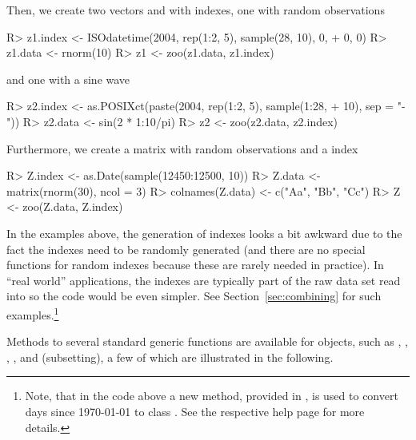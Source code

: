 \documentclass[article,nojss]{jss}
\begin{document}
Then, we create two vectors  and  with  
indexes, one with random observations
\begin{Schunk}
\begin{Sinput}
R> z1.index <- ISOdatetime(2004, rep(1:2, 5), sample(28, 10), 0, 
+     0, 0)
R> z1.data <- rnorm(10)
R> z1 <- zoo(z1.data, z1.index)
\end{Sinput}
\end{Schunk}
and one with a sine wave
\begin{Schunk}
\begin{Sinput}
R> z2.index <- as.POSIXct(paste(2004, rep(1:2, 5), sample(1:28, 
+     10), sep = "-"))
R> z2.data <- sin(2 * 1:10/pi)
R> z2 <- zoo(z2.data, z2.index)
\end{Sinput}
\end{Schunk}
Furthermore, we create a matrix  with random observations and a 
index
\begin{Schunk}
\begin{Sinput}
R> Z.index <- as.Date(sample(12450:12500, 10))
R> Z.data <- matrix(rnorm(30), ncol = 3)
R> colnames(Z.data) <- c("Aa", "Bb", "Cc")
R> Z <- zoo(Z.data, Z.index)
\end{Sinput}
\end{Schunk}
In the examples above, the generation of indexes looks a bit awkward
due to the fact the indexes need to be randomly generated (and there 
are no special functions for random indexes because these are rarely 
needed in practice). In ``real world'' applications, the indexes
are typically part of the raw data set read into  so the
code would be even simpler. See Section~\ref{sec:combining}
for such examples.\footnote{Note, that in the code above a new 
method, provided in , is used to convert days 
since 1970-01-01 to class . See the respective help page 
for more details.}

Methods to several standard generic functions are available for
 objects, such as , , , ,
 and \code{[} (subsetting), a few of which are illustrated in
the following.
\end{document}
